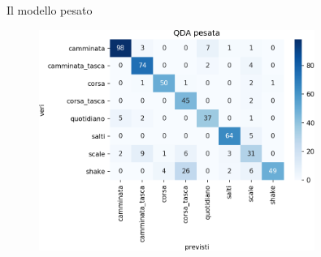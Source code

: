 \documentclass{beamer}
\begin{document}
\begin{frame}{Il modello pesato}
\begin{figure}[H]
\includegraphics[width=0.8\textwidth]{../figure/confusionMatrix-QDA-penalizzata.png}
\end{figure}
\end{frame}
\end{document}
